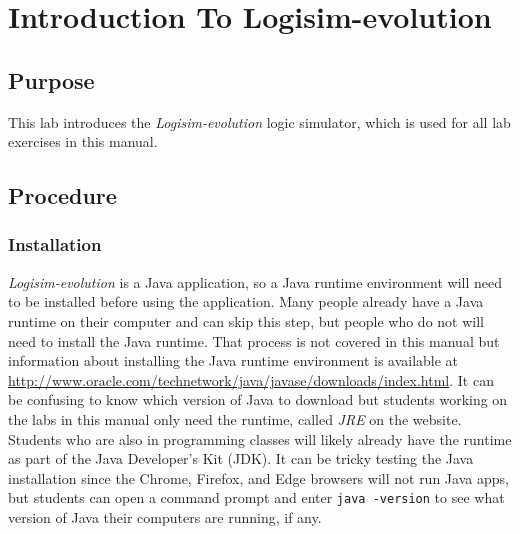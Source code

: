 
\chapter{Introduction To Logisim-evolution}



\section{Purpose}

This lab introduces the \textit{Logisim-evolution} logic simulator, which is used for all lab exercises in this manual. 


\section{Procedure}

\subsection{Installation}

\textit{Logisim-evolution} is a Java application, so a Java runtime environment will need to be installed before using the application. Many people already have a Java runtime on their computer and can skip this step, but people who do not will need to install the Java runtime. That process is not covered in this manual but information about installing the Java runtime environment is available at \url{http://www.oracle.com/technetwork/java/javase/downloads/index.html}. It can be confusing to know which version of Java to download but students working on the labs in this manual only need the runtime, called \textit{JRE} on the website. Students who are also in programming classes will likely already have the runtime as part of the Java Developer's Kit (JDK). It can be tricky testing the Java installation since the Chrome, Firefox, and Edge browsers will not run Java apps, but students can open a command prompt and enter \lstinline|java -version| to see what version of Java their computers are running, if any.

